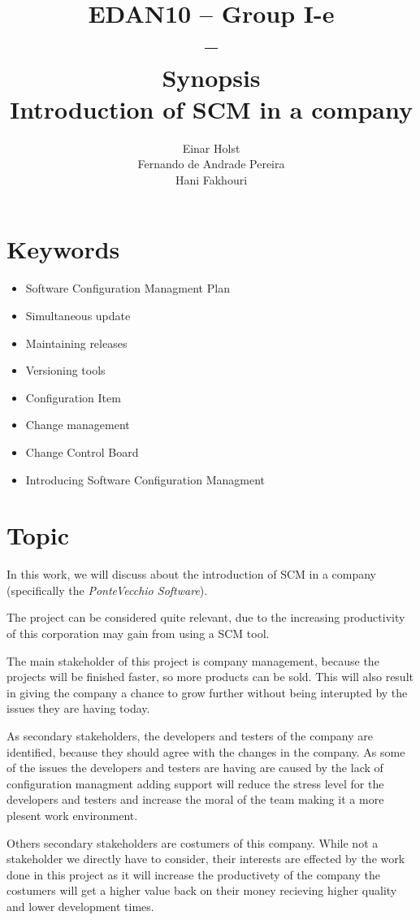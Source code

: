 \documentclass[a4paper]{article}
\title{EDAN10 -- Group I-e\\--\\ Synopsis \\
Introduction of SCM in a company 
}
\author{Einar Holst \\
Fernando de Andrade Pereira \\
Hani Fakhouri
}
\begin{document}
\maketitle
\thispagestyle{empty}
\clearpage

\tableofcontents
\thispagestyle{empty}
\clearpage

\setcounter{page}{1}

\section{Keywords}
\begin{itemize}
\item Software Configuration Managment Plan
\item Simultaneous update
\item Maintaining releases
\item Versioning tools
\item Configuration Item
\item Change management
\item Change Control Board
\item Introducing Software Configuration Managment
\end{itemize}


\section{Topic}
In this work, we will discuss about the introduction of SCM in a company (specifically the \emph{PonteVecchio Software}).

The project can be considered quite relevant, due to the increasing productivity of this corporation may gain from using a SCM tool.

The main stakeholder of this project is company management, because the projects will be finished faster, so more products can be sold. This will also result in giving the company a chance to grow further without being interupted by the issues they are having today.

As secondary stakeholders, the developers and testers of the company are identified, because they should agree with the changes in the company. As some of the issues the developers and testers are having are caused by the lack of configuration managment adding support will reduce the stress level for the developers and testers and increase the moral of the team making it a more plesent work environment.

Others secondary stakeholders are costumers of this company. While not a stakeholder we directly have to consider, their interests are effected by the work done in this project as it will increase the productivety of the company the costumers will get a higher value back on their money recieving higher quality and lower development times.
\end{document}
